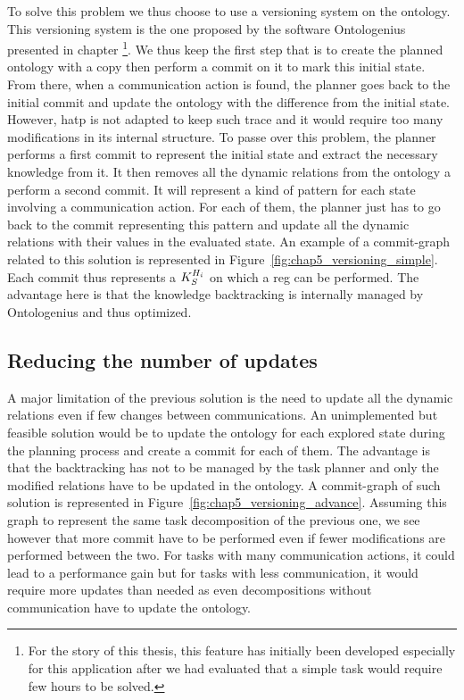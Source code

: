 To solve this problem we thus choose to use a versioning system on the ontology. This versioning system is the one proposed by the software Ontologenius presented in chapter  \footnote{For the story of this thesis, this feature has initially been developed especially for this application after we had evaluated that a simple task would require few hours to be solved.}. We thus keep the first step that is to create the planned ontology with a copy then perform a commit on it to mark this initial state. From there, when a communication action is found, the planner goes back to the initial commit and update the ontology with the difference from the initial state. However, \acrshort{hatp} is not adapted to keep such trace and it would require too many modifications in its internal structure. To passe over this problem, the planner performs a first commit to represent the initial state and extract the necessary knowledge from it. It then removes all the dynamic relations from the ontology a perform a second commit. It will represent a kind of pattern for each state involving a communication action. For each of them, the planner just has to go back to the commit representing this pattern and update all the dynamic relations with their values in the evaluated state. An example of a commit-graph related to this solution is represented in Figure~\ref{fig:chap5_versioning_simple}. Each commit thus represents a $K_S^{H_i}$ on which a \acrshort{reg} can be performed. The advantage here is that the knowledge backtracking is internally managed by Ontologenius and thus optimized.

\subsection{Reducing the number of updates}

A major limitation of the previous solution is the need to update all the dynamic relations even if few changes between communications. An unimplemented but feasible solution would be to update the ontology for each explored state during the planning process and create a commit for each of them. The advantage is that the backtracking has not to be managed by the task planner and only the modified relations have to be updated in the ontology. A commit-graph of such solution is represented in Figure~\ref{fig:chap5_versioning_advance}. Assuming this graph to represent the same task decomposition of the previous one, we see however that more commit have to be performed even if fewer modifications are performed between the two. For tasks with many communication actions, it could lead to a performance gain but for tasks with less communication, it would require more updates than needed as even decompositions without communication have to update the ontology.

